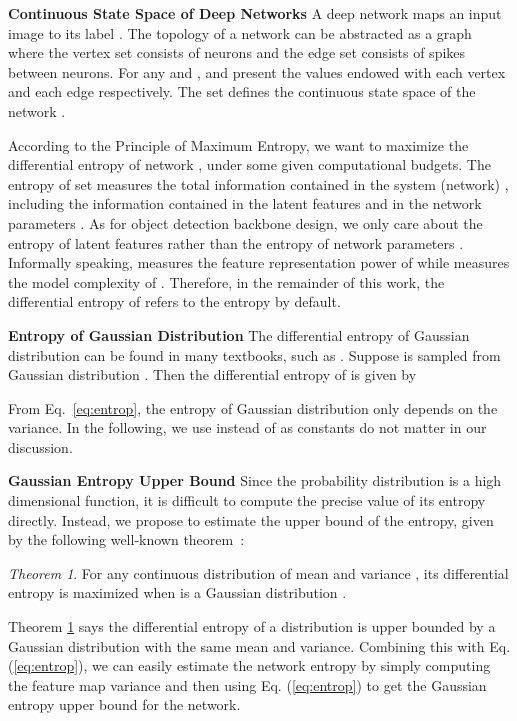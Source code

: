 \documentclass[nohyperref]{article}
\theoremstyle{plain}
\theoremstyle{definition}
\theoremstyle{remark}
\newtheorem{thm}{Theorem}
\begin{document}
\noindent\textbf{Continuous State Space of Deep Networks} 
A deep network  maps an input image  to its label . The topology of a network can be abstracted as a graph  where the vertex set  consists of neurons and the edge set  consists of spikes between neurons. For any  and ,  and  present the values endowed with each vertex  and each edge  respectively. The set  defines the continuous state space of the network .

According to the Principle of Maximum Entropy, we want to maximize the differential entropy of network , under some given computational budgets. The entropy  of set  measures the total information contained in the system (network) , including the information contained in the latent features  and in the network parameters  . As for object detection backbone design, we only care about the entropy of latent features  rather than the entropy of network parameters . Informally speaking,  measures the feature representation power of  while  measures the model complexity of .  Therefore, in the remainder of this work, the differential entropy of  refers to the entropy  by default.

\noindent\textbf{Entropy of Gaussian Distribution}
The differential entropy of Gaussian distribution can be found in many textbooks, such as \citep{entropy}.
Suppose  is sampled from Gaussian distribution . Then the differential entropy of  is given by

From Eq.~\ref{eq:entrop}, the entropy of Gaussian distribution only depends on the variance. In the following, we use  instead of  as constants do not matter in our discussion.


\noindent\textbf{Gaussian Entropy Upper Bound} Since the probability distribution  is a high dimensional function, it is difficult to compute the precise value of its entropy directly. Instead, we propose to estimate the upper bound of the entropy, given by the following well-known theorem~\citep{coverElementsInformationTheory2012}:

\begin{thm}
	\label{thm:gaussian-upper-bound-entropy} For any continuous distribution  of mean  and variance , its differential entropy is maximized when  is a Gaussian distribution .
\end{thm}

Theorem \ref{thm:gaussian-upper-bound-entropy} says the differential entropy of a distribution is upper bounded by a Gaussian distribution with the same mean and variance. Combining this with Eq. (\ref{eq:entrop}), we can easily estimate the network entropy  by simply computing the feature map variance and then using Eq. (\ref{eq:entrop}) to get the Gaussian entropy upper bound for the network.
\end{document}
